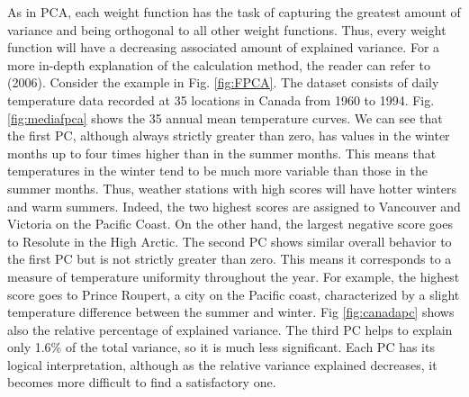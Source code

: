 As in PCA, each weight function has the task of capturing the greatest amount of variance and being orthogonal to all other weight functions. Thus, every weight function will have a decreasing associated amount of explained variance. For a more in-depth explanation of the calculation method, the reader can refer to \citeauthor{ramsay_functional_2006} (2006). Consider the example in Fig. \ref{fig:FPCA}. The dataset consists of daily temperature data recorded at 35 locations in Canada from 1960 to 1994. Fig. \ref{fig:mediafpca} shows the 35 annual mean temperature curves. We can see that the first PC, although always strictly greater than zero, has values in the winter months up to four times higher than in the summer months. This means that temperatures in the winter tend to be much more variable than those in the summer months. Thus, weather stations with high scores will have hotter winters and warm summers. Indeed, the two highest scores are assigned to Vancouver and Victoria on the Pacific Coast. On the other hand, the largest negative score goes to Resolute in the High Arctic. The second PC shows similar overall behavior to the first PC but is not strictly greater than zero. This means it corresponds to a measure of temperature uniformity throughout the year. For example, the highest score goes to Prince Roupert, a city on the Pacific coast, characterized by a slight temperature difference between the summer and winter. Fig \ref{fig:canadapc} shows also the relative percentage of explained variance. The third PC helps to explain only 1.6\% of the total variance, so it is much less significant. Each PC has its logical interpretation, although as the relative variance explained decreases, it becomes more difficult to find a satisfactory one.
